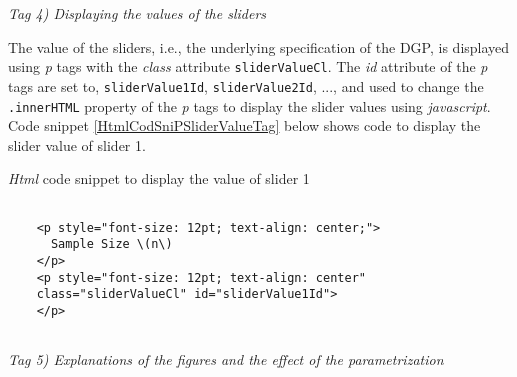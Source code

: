 \documentclass[12pt]{article}
\begin{document}

\vspace{1em}
\noindent\emph{Tag 4) Displaying the values of the sliders}

The value of the sliders, i.e., the underlying specification of the DGP, is displayed using \emph{p} tags with the \emph{class} attribute \texttt{sliderValueCl}. 
%
The \emph{id} attribute of the \emph{p} tags are set to, \texttt{sliderValue1Id}, \texttt{sliderValue2Id}, ..., and used to change the \texttt{.innerHTML} property of the \emph{p} tags to display the slider values using \emph{javascript}. 
%
Code snippet \ref{HtmlCodSniPSliderValueTag} below shows code to display the slider value of slider 1. 
%
\begin{CodeSnippet}[!hp]
	\centering
	\caption{\emph{Html} code snippet to display the value of slider 1}
	\footnotesize
	\vspace{0.25cm}
	\begin{BVerbatim}
		
	<p style="font-size: 12pt; text-align: center;">
	  Sample Size \(n\)
	</p>
	<p style="font-size: 12pt; text-align: center"
	class="sliderValueCl" id="sliderValue1Id">
	</p>
		
	\end{BVerbatim}
	\label{HtmlCodSniPSliderValueTag}
\end{CodeSnippet}


\vspace{1em}
\noindent\emph{Tag 5) Explanations of the figures and the effect of the parametrization}
\end{document}
